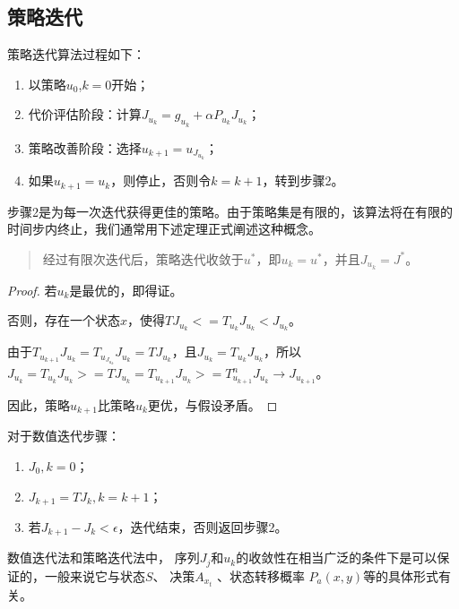 \subsection{策略迭代}

策略迭代算法过程如下：

\begin{enumerate}[itemsep=0pt,parsep=0pt]
    \item 以策略$u_0$,$k=0$开始；
    \item 代价评估阶段：计算$J_{u_k} = g_{u_k}+\alpha P_{u_k}J_{u_k}$；
    \item 策略改善阶段：选择$u_{k+1} = u_{J_{u_k}}$；
    \item 如果$u_{k+1} = u_k$，则停止，否则令$k=k+1$，转到步骤2。
\end{enumerate}

\begin{note}
    步骤2是为每一次迭代获得更佳的策略。由于策略集是有限的，该算法将在有限的时间步内终止，我们通常用下述定理正式阐述这种概念。
\end{note}

\begin{quote}
    经过有限次迭代后，策略迭代收敛于$u^*$，即$u_k=u^*$，并且$J_{u_k}=J^*$。
\end{quote}

\begin{proof}
    若$u_k$是最优的，即得证。

    否则，存在一个状态$x$，使得$T J_{u_k} <= T_{u_k}J_{u_k} < J_{u_k}$。

    由于$T_{u_{k+1}}J_{u_k} = T_{u_{J_{u_k}}}J_{u_k} = TJ_{u_k}$，且$J_{u_k}=T_{u_k}J_{u_k}$，所以$J_{u_k} = T_{u_{k}}J_{u_k} >= TJ_{u_k} = T_{u_{k+1}}J_{u_k} >= T^n_{u_{k+1}}J_{u_k} \rightarrow J_{u_{k+1}}$。

    因此，策略$u_{k+1}$比策略$u_k$更优，与假设矛盾。
\end{proof}

对于数值迭代步骤：

\begin{enumerate}[itemsep=0pt,parsep=0pt]
    \item $J_0, k = 0$；
    \item $J_{k+1} = T J_k, k = k+1$；
    \item 若$J_{k+1} - J_k < \epsilon$，迭代结束，否则返回步骤2。
\end{enumerate}

数值迭代法和策略迭代法中， 序列$J_j$和$u_k$的收敛性在相当广泛的条件下是可以保证的，一般来说它与状态$S$、 决策$A_{x_t}$ 、状态转移概率 $P_a(x,y)$等的具体形式有关。

